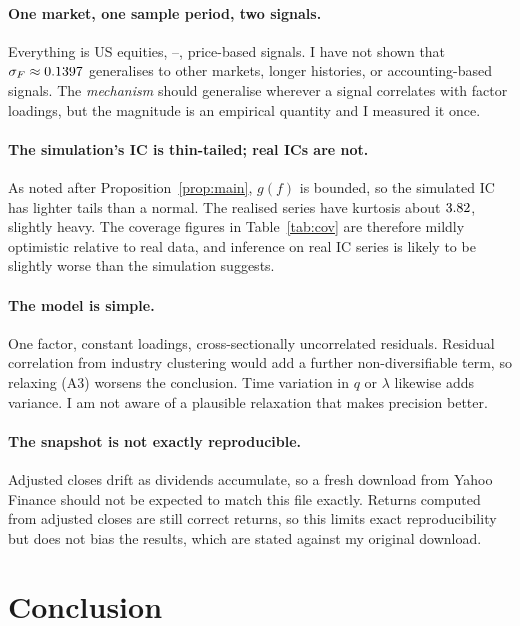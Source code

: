 \documentclass[11pt,a4paper]{article}
\newcommand{\sF}{\sigma_F}
\begin{document}
\paragraph{One market, one sample period, two signals.}
Everything is US equities, \panelStart{}--\panelEnd{}, price-based signals. I have not
shown that $\sF \approx \momFloor$ generalises to other markets, longer histories, or
accounting-based signals. The \emph{mechanism} should generalise wherever a signal
correlates with factor loadings, but the magnitude is an empirical quantity and I
measured it once.

\paragraph{The simulation's IC is thin-tailed; real ICs are not.}
As noted after Proposition~\ref{prop:main}, $g(f)$ is bounded, so the simulated IC has
lighter tails than a normal. The realised series have kurtosis about $3.82$, slightly
heavy. The coverage figures in Table~\ref{tab:cov} are therefore mildly optimistic
relative to real data, and inference on real IC series is likely to be slightly worse
than the simulation suggests.

\paragraph{The model is simple.}
One factor, constant loadings, cross-sectionally uncorrelated residuals. Residual
correlation from industry clustering would add a further non-diversifiable term, so
relaxing (A3) worsens the conclusion. Time variation in $q$ or $\lambda$ likewise adds
variance. I am not aware of a plausible relaxation that makes precision better.

\paragraph{The snapshot is not exactly reproducible.}
Adjusted closes drift as dividends accumulate, so a fresh download from Yahoo Finance should not be
expected to match this file exactly. Returns computed from adjusted closes are still correct returns, so this limits exact
reproducibility but does not bias the results, which are stated against my original
download.

\section{Conclusion}
\end{document}
